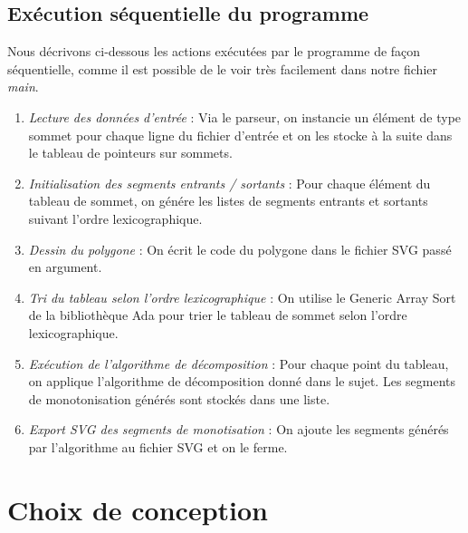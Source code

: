 \documentclass[10.9pt]{article}
\begin{document}
\newpage

\subsection{Exécution séquentielle du programme}
Nous décrivons ci-dessous les actions exécutées par le programme de
façon séquentielle, comme il est possible de le voir très facilement
dans notre fichier \emph{main}.

\begin{enumerate}
\item \emph{Lecture des données d'entrée} : Via le parseur, on
  instancie un élément de type sommet pour chaque ligne du fichier
  d'entrée et on les stocke à la suite dans le tableau de pointeurs sur sommets.
\item \emph{Initialisation des segments entrants / sortants} : Pour
  chaque élément du tableau de sommet, on génére les listes de
  segments entrants et sortants suivant l'ordre lexicographique.
\item \emph{Dessin du polygone} : On écrit le code du polygone dans le
  fichier SVG passé en argument.
\item \emph{Tri du tableau selon l'ordre lexicographique} : On utilise
  le Generic Array Sort de la bibliothèque Ada pour trier le tableau
  de sommet selon l'ordre lexicographique.
\item \emph{Exécution de l'algorithme de décomposition} : Pour chaque
  point du tableau, on applique l'algorithme de décomposition donné
  dans le sujet. Les segments de monotonisation générés sont stockés
  dans une liste.
\item \emph{Export SVG des segments de monotisation} : On ajoute les
  segments générés par l'algorithme au fichier SVG et on le ferme.
\end{enumerate}

\section{Choix de conception}
\end{document}
